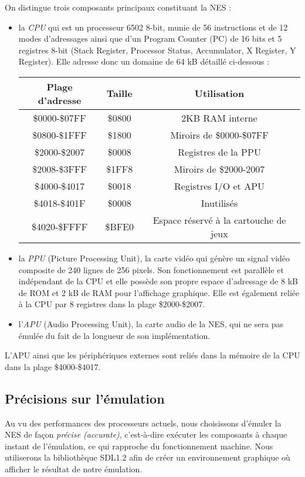 On distingue trois composants principaux constituant la NES :
\begin{itemize}
\item la \emph{CPU} qui est un processeur 6502 8-bit, munie de 56 instructions et de 12 modes d'adressages ainsi que d'un Program Counter (PC) de 16 bits et 5 registres 8-bit (Stack Register, Processor Status, Accumulator, X Register, Y Register). Elle adresse donc un domaine de 64 kB détaillé ci-dessous :

\begin{center}
\begin{tabular}{|c|c|c|}
  \hline
  Plage d'adresse & Taille & Utilisation \\
  \hline
  \$0000-\$07FF & \$0800 & 2KB RAM interne\\
  \hline
  \$0800-\$1FFF & \$1800 & Miroirs de \$0000-\$07FF \\
  \hline
  \$2000-\$2007 & \$0008 & Registres de la PPU \\
  \hline
  \$2008-\$3FFF & \$1FF8 & Miroirs de \$2000-2007 \\
  \hline
  \$4000-\$4017 & \$0018 & Registres I/O et APU \\
  \hline
  \$4018-\$401F & \$0008 & Inutilisés \\
  \hline
  \$4020-\$FFFF & \$BFE0 & Espace réservé à la cartouche de jeux \\
  \hline
\end{tabular}
\end{center}
\hspace{1pt}
\item la \emph{PPU} (Picture Processing Unit), la carte vidéo qui génère un signal vidéo composite de 240 lignes de 256 pixels. Son fonctionnement est parallèle et indépendant de la CPU et elle possède son propre espace d'adressage de 8 kB de ROM et 2 kB de RAM pour l'affichage graphique. Elle est également reliée à la CPU par 8 registres dans la plage \$2000-\$2007.
\item l'\emph{APU} (Audio Processing Unit), la carte audio de la NES, qui ne sera pas émulée du fait de la longueur de son implémentation.
\end{itemize}

L'APU ainsi que les périphériques externes sont reliés dans la mémoire de la CPU dans la plage \$4000-\$4017.

\subsection{Précisions sur l'émulation}
\label{subsec:precision_sur_lemulation}
Au vu des performances des processeurs actuels, nous choisissons d'émuler la NES de façon \emph{précise (accurate)}, c'est-à-dire exécuter les composants à chaque instant de l'émulation, ce qui rapproche du fonctionnement machine.
Nous utiliserons la bibliothèque SDL1.2 afin de créer un environnement graphique où afficher le résultat de notre émulation.

